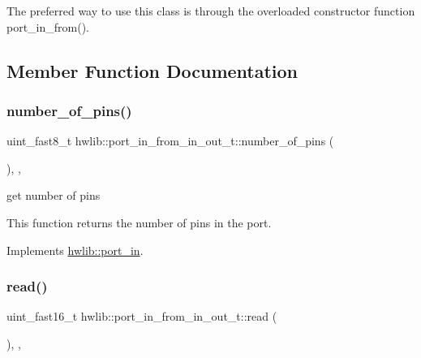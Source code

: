 The preferred way to use this class is through the overloaded constructor function port\+\_\+in\+\_\+from(). 

\subsection{Member Function Documentation}
\mbox{\label{classhwlib_1_1port__in__from__in__out__t_a297458e2944e9952b09a36fe6ac30caf}} 
\subsubsection{\texorpdfstring{number\+\_\+of\+\_\+pins()}{number\_of\_pins()}}
{\footnotesize\ttfamily uint\+\_\+fast8\+\_\+t hwlib\+::port\+\_\+in\+\_\+from\+\_\+in\+\_\+out\+\_\+t\+::number\+\_\+of\+\_\+pins (\begin{DoxyParamCaption}{ }\end{DoxyParamCaption})\hspace{0.3cm}{\ttfamily [inline]}, {\ttfamily [override]}, {\ttfamily [virtual]}}





get number of pins

This function returns the number of pins in the port. 

Implements \hyperlink{classhwlib_1_1port__in_a3498fc0158e1e460a00d671df629fe22}{hwlib\+::port\+\_\+in}.

\mbox{\label{classhwlib_1_1port__in__from__in__out__t_ab5307198f2acb61897da52a1043fa7a6}} 
\subsubsection{\texorpdfstring{read()}{read()}}
{\footnotesize\ttfamily uint\+\_\+fast16\+\_\+t hwlib\+::port\+\_\+in\+\_\+from\+\_\+in\+\_\+out\+\_\+t\+::read (\begin{DoxyParamCaption}{ }\end{DoxyParamCaption})\hspace{0.3cm}{\ttfamily [inline]}, {\ttfamily [override]}, {\ttfamily [virtual]}}





